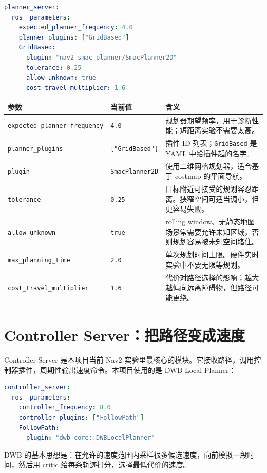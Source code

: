 \documentclass[UTF8,11pt,a4paper,openany]{ctexrep}
\newcommand{\code}[1]{\nolinkurl{#1}}
\newcommand{\param}[1]{\nolinkurl{#1}}
\newcommand{\pkg}[1]{\nolinkurl{#1}}
\begin{document}
\begin{lstlisting}[language=yaml]
planner_server:
  ros__parameters:
    expected_planner_frequency: 4.0
    planner_plugins: ["GridBased"]
    GridBased:
      plugin: "nav2_smac_planner/SmacPlanner2D"
      tolerance: 0.25
      allow_unknown: true
      cost_travel_multiplier: 1.6
\end{lstlisting}

\begin{longtable}{L{0.27\textwidth}L{0.18\textwidth}L{0.45\textwidth}}
\toprule
参数 & 当前值 & 含义 \\
\midrule
\param{expected_planner_frequency} & \code{4.0} & 规划器期望频率，用于诊断性能；短距离实验不需要太高。 \\
\param{planner_plugins} & \code{["GridBased"]} & 插件 ID 列表；\code{GridBased} 是 YAML 中给插件起的名字。 \\
\param{plugin} & \pkg{SmacPlanner2D} & 使用二维网格规划器，适合基于 costmap 的平面导航。 \\
\param{tolerance} & \code{0.25} & 目标附近可接受的规划容忍距离。狭窄空间可适当调小，但更容易失败。 \\
\param{allow_unknown} & \code{true} & rolling window、无静态地图场景常需要允许未知区域，否则规划容易被未知空间堵住。 \\
\param{max_planning_time} & \code{2.0} & 单次规划时间上限。硬件实时实验中不要无限等规划。 \\
\param{cost_travel_multiplier} & \code{1.6} & 代价对路径选择的影响；越大越偏向远离障碍物，但路径可能更绕。 \\
\bottomrule
\end{longtable}

\section{Controller Server：把路径变成速度}

Controller Server 是本项目当前 Nav2 实验里最核心的模块。它接收路径，调用控制器插件，周期性输出速度命令。本项目使用的是 DWB Local Planner：

\begin{lstlisting}[language=yaml]
controller_server:
  ros__parameters:
    controller_frequency: 8.0
    controller_plugins: ["FollowPath"]
    FollowPath:
      plugin: "dwb_core::DWBLocalPlanner"
\end{lstlisting}

DWB 的基本思想是：在允许的速度范围内采样很多候选速度，向前模拟一段时间，然后用 critic 给每条轨迹打分，选择最低代价的速度。
\end{document}
